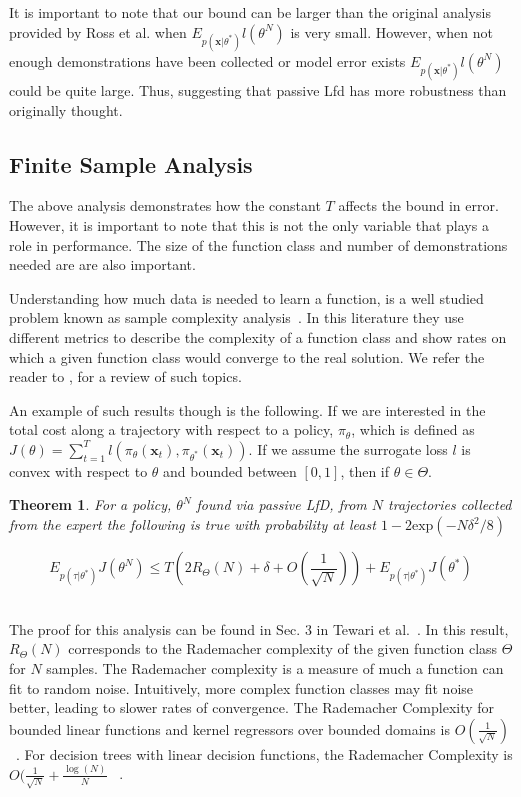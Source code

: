 \documentclass[10pt, conference]{ieeeconf}      %
\newtheorem{theorem}{Theorem}[section]
\newcommand{\bx}{\mathbf{x}}
\begin{document}
It is important to note that our bound can be larger than the original analysis provided by Ross et al. when  $E_{p(\bx|\theta^*)} l(\theta^N)$ is very small. However, when not enough demonstrations have been collected or model error exists $E_{p(\bx|\theta^*)} l(\theta^N)$ could be quite large. Thus, suggesting that passive Lfd has more robustness than originally thought. 

\subsection{Finite Sample Analysis}
The above analysis demonstrates how the constant $T$ affects the bound in error. However, it is important to note that this is not the only variable that plays a role in performance. The size of the function class and number of demonstrations needed are are also important. 

Understanding how much data is needed to learn a function, is a well studied problem known as sample complexity analysis~\cite{anthony2009neural}. In this literature they use different metrics to describe the complexity of a function class and show rates on which a given function class would converge to the real solution. We refer the reader to \cite{vapnik2013nature}, for a review of such topics. 

An example of such results though is the following.  If we are interested in the total cost along a trajectory with respect to a policy, $\pi_{\theta}$, which is defined as $J(\theta) = \sum^T_{t=1} l(\pi_{\theta}(\bx_{t}),\pi_{\theta^*}(\bx_{t}))$.  If we assume the surrogate loss $l$ is convex with respect to $\theta$ and bounded between $[0,1]$, then if $\theta \in \Theta$. \\

\begin{theorem}\label{thm:sup}
For a policy, $\theta^N$ found via passive LfD, from $N$ trajectories collected from the expert the following is true with probability at least $1- 2\mbox{exp} (-N\delta^2/8)$

$$E_{p(\tau|\theta^*)} J(\theta^N)\leq T( 2R_{\Theta}(N) + \delta+ O(\frac{1}{\sqrt{N}})) + E_{p(\tau|\theta^*)} J(\theta^*)$$\\

\end{theorem}

The proof for this analysis can be found in Sec. 3 in Tewari et al.~\cite{tewari13learning}. In this result, $R_{\Theta}(N)$ corresponds to the Rademacher complexity of the given function class $\Theta$ for $N$ samples.
The Rademacher complexity is a measure of much a function can fit to random noise.
Intuitively, more complex function classes may fit noise better, leading to slower rates of convergence.
The Rademacher Complexity for bounded linear functions and kernel regressors over bounded domains is $O (\frac{1}{\sqrt{N}})$ ~\cite{bartlett2002rademacher, kakade2009complexity}.
For decision trees with linear decision functions, the Rademacher Complexity is $O (\frac{1}{\sqrt{N}} + \frac{\log(N)}{N}$ ~\cite{bartlett2002rademacher}.
\end{document}
